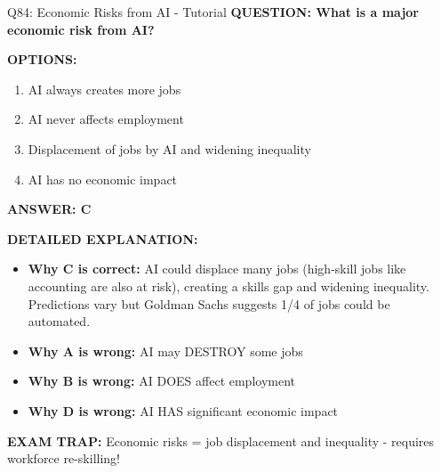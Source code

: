 \documentclass[8pt]{beamer}
\begin{document}
	\begin{frame}{Q84: Economic Risks from AI - Tutorial}
		\fontsize{6.5}{7.5}\selectfont
		\textbf{QUESTION: What is a major economic risk from AI?}
		
		\vspace{0.1cm}
		\textbf{OPTIONS:}
		\begin{enumerate}
			\item AI always creates more jobs
			\item AI never affects employment
			\item Displacement of jobs by AI and widening inequality
			\item AI has no economic impact
		\end{enumerate}
		
		\vspace{0.1cm}
		\textcolor{myblue}{\textbf{ANSWER: C}}
		
		\vspace{0.1cm}
		\textbf{DETAILED EXPLANATION:}
		\begin{itemize}
			\item \textbf{Why C is correct:} AI could displace many jobs (high-skill jobs like accounting are also at risk), creating a skills gap and widening inequality. Predictions vary but Goldman Sachs suggests 1/4 of jobs could be automated.
			\item \textbf{Why A is wrong:} AI may DESTROY some jobs
			\item \textbf{Why B is wrong:} AI DOES affect employment
			\item \textbf{Why D is wrong:} AI HAS significant economic impact
		\end{itemize}
		
		\textcolor{myred}{\textbf{EXAM TRAP:}} Economic risks = \textcolor{myblue}{job displacement and inequality} - requires workforce re-skilling!
	\end{frame}
	
\end{document}
